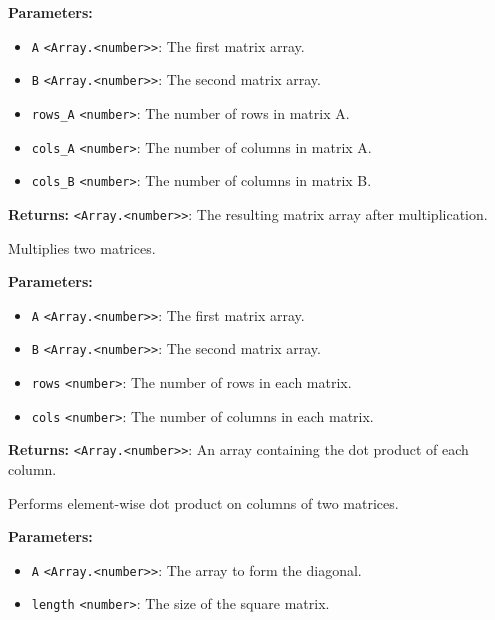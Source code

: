 \documentclass[12pt,a4paper]{article}
\begin{document}
\noindent \textbf{Parameters:}
\begin{itemize}
  \item \texttt{A} \texttt{<Array.<number>>}: The first matrix array.
  \item \texttt{B} \texttt{<Array.<number>>}: The second matrix array.
  \item \texttt{rows\_A} \texttt{<number>}: The number of rows in matrix A.
  \item \texttt{cols\_A} \texttt{<number>}: The number of columns in matrix A.
  \item \texttt{cols\_B} \texttt{<number>}: The number of columns in matrix B.
\end{itemize}

\noindent \textbf{Returns:} \texttt{<Array.<number>>}: The resulting matrix array after multiplication.

\noindent Multiplies two matrices.

\vspace{5mm}
\noindent {}


\noindent \textbf{Parameters:}
\begin{itemize}
  \item \texttt{A} \texttt{<Array.<number>>}: The first matrix array.
  \item \texttt{B} \texttt{<Array.<number>>}: The second matrix array.
  \item \texttt{rows} \texttt{<number>}: The number of rows in each matrix.
  \item \texttt{cols} \texttt{<number>}: The number of columns in each matrix.
\end{itemize}

\noindent \textbf{Returns:} \texttt{<Array.<number>>}: An array containing the dot product of each column.

\noindent Performs element-wise dot product on columns of two matrices.

\vspace{5mm}
\noindent {}


\noindent \textbf{Parameters:}
\begin{itemize}
  \item \texttt{A} \texttt{<Array.<number>>}: The array to form the diagonal.
  \item \texttt{length} \texttt{<number>}: The size of the square matrix.
\end{itemize}
\end{document}
